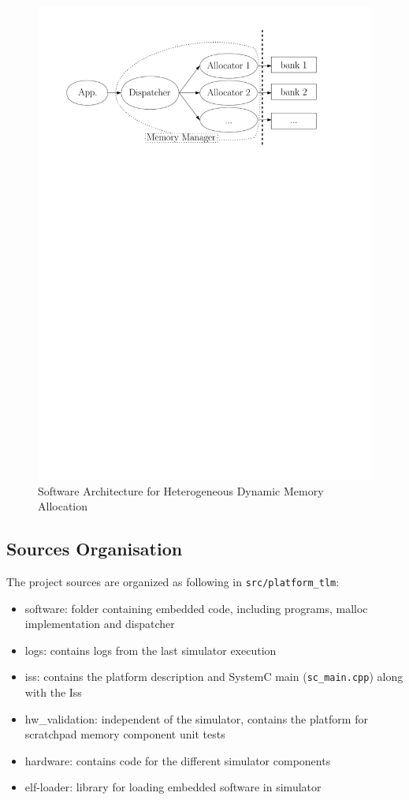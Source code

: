\documentclass[10 pt]{article}
\begin{document}
\begin{figure}[b]
  \centering
  \includegraphics[width=.7\textwidth]{img/sw_hw}
\caption{Software Architecture for Heterogeneous Dynamic Memory Allocation}
\label{sw-arch}
\end{figure}

\subsection{Sources Organisation}
The project sources are organized as following in \lstinline{src/platform_tlm}:
\begin{itemize}
  \item software: folder containing embedded code, including programs, malloc implementation and dispatcher
  \item logs: contains logs from the last simulator execution
  \item iss: contains the platform description and SystemC main (\lstinline{sc_main.cpp}) along with the Iss
  \item hw\_validation: independent of the simulator, contains the platform for scratchpad memory component unit tests
  \item hardware: contains code for the different simulator components
  \item elf-loader: library for loading embedded software in simulator
\end{itemize}
\end{document}
